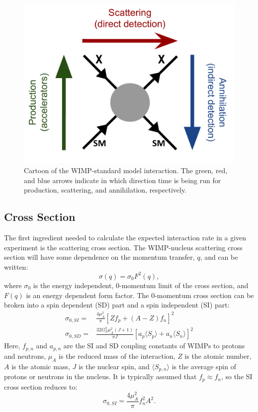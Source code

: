 \begin{figure}[h!]
\centering
\includegraphics[width=150mm]{Figures/WIMP_interaction.pdf}
\caption{Cartoon of the WIMP-standard model interaction. The green, red, and blue arrows indicate in which direction time is being run for production, scattering, and annihilation, respectively.}
\label{fig:WIMP_SM} 
\end{figure}

\subsection{Cross Section}
The first ingredient needed to calculate the expected interaction rate in a given experiment is the scattering cross section. The WIMP-nucleus scattering cross section will have some dependence on the momentum transfer, $q$, and can be written\cite{dmintro}:
\begin{equation}\label{eq:cross_sec1}
\sigma(q)=\sigma_0F^2(q),
\end{equation}
where $\sigma_0$ is the energy independent, 0-momentum limit of the cross section, and $F(q)$ is an energy dependent form factor. The 0-momentum cross section can be broken into a spin dependent (SD) part and a spin independent (SI) part\cite{wimp_nucleon,dmintro}:
\begin{equation}\label{eq:sisd_cs}
\begin{split}
\sigma_{0,SI}=& \frac{4\mu_A^2}{\pi}[Zf_p+(A-Z)f_n]^2 \\
\sigma_{0,SD}=& \frac{32G_F^2\mu_A^2(J+1)}{\pi J}[a_p\langle S_p \rangle + a_n\langle S_n \rangle ]^2
\end{split}
\end{equation} 
Here, $f_{p,n}$ and $a_{p,n}$ are the SI and SD coupling constants of WIMPs to protons and neutrons, $\mu_A$ is the reduced mass of the interaction, $Z$ is the atomic number, $A$ is the atomic mass, $J$ is the nuclear spin, and $\langle S_{p,n} \rangle$ is the average spin of protons or neutrons in the nucleus. It is typically assumed that $f_p \approx f_n$, so the SI cross section reduces to:
\begin{equation}\label{eq:sics}
\sigma_{0,SI}= \frac{4\mu_A^2}{\pi}f_n^2A^2. 
\end{equation} 

